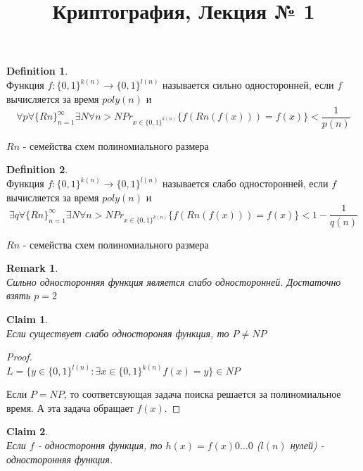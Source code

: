 \documentclass[a4paper]{article}
\title{Криптография, Лекция № 1}
\theoremstyle{definition}
\newtheorem{definition}{Definition}
\theoremstyle{plain}
\newtheorem{remark}{Remark}
\newtheorem{claim}{Claim}
\begin{document}
\maketitle

\begin{definition}~\\
    Функция $f\colon \{0, 1\}^{k(n)} \rightarrow \{0, 1\}^{l(n)}$ называется сильно односторонней, если $f$ вычисляется за время $poly(n)$ и
    $$
        \forall p \forall\{Rn\}_{n = 1}^{\infty} \exists N \forall n > N Pr_{x \in \{0, 1\}^{k(n)}}\{f(Rn(f(x))) = f(x)\} < \frac{1}{p(n)}
    $$
    
  \noindent $Rn$ - семейства схем полиномиального размера
\end{definition}


\begin{definition}~\\
    Функция $f\colon \{0, 1\}^{k(n)} \rightarrow \{0, 1\}^{l(n)}$ называется слабо односторонней, если $f$ вычисляется за время $poly(n)$ и 
    $$
        \exists q \forall\{Rn\}_{n = 1}^{\infty} \exists N \forall n > N Pr_{x \in \{0, 1\}^{k(n)}}\{f(Rn(f(x))) = f(x)\} < 1 - \frac{1}{q(n)}
        $$
    
  \noindent $Rn$ - семейства схем полиномиального размера
\end{definition}


\begin{remark}~\\
    Сильно односторонняя функция является слабо односторонней. Достаточно взять $p = 2$
\end{remark}


\begin{claim}~\\
    Если существует слабо одностороняя функция, то $P \ne NP$
\end{claim}

\begin{proof}~\\
    $L = \{y \in \{0, 1\}^{l(n)} \colon \exists x \in \{0, 1\}^{k(n)} f(x) = y\} \in NP$
    
    \noindent Если $P = NP$, то соответсвующая задача поиска решается за полиномиальное время. А эта задача обращает $f(x)$.
\end{proof}

\begin{claim}~\\
    Если $f$ - одностороння функция, то $h(x) = f(x)0\ldots0$ ($l(n)$ нулей) - односторонняя функция.
\end{claim}
\end{document}
